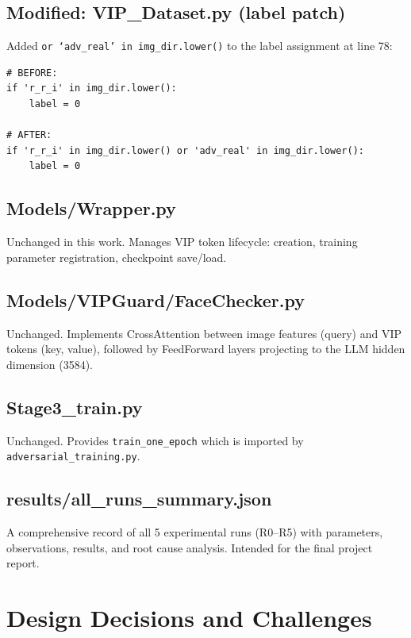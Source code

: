 \documentclass[12pt,a4paper]{article}
\begin{document}
\subsection{Modified: VIP\_Dataset.py (label patch)}

Added \texttt{or `adv\_real' in img\_dir.lower()} to the label assignment at line 78:
\begin{lstlisting}[caption={VIP\_Dataset.py label patch}]
# BEFORE:
if 'r_r_i' in img_dir.lower():
    label = 0

# AFTER:
if 'r_r_i' in img_dir.lower() or 'adv_real' in img_dir.lower():
    label = 0
\end{lstlisting}

\subsection{Models/Wrapper.py}

Unchanged in this work. Manages VIP token lifecycle: creation, training parameter registration, checkpoint save/load.

\subsection{Models/VIPGuard/FaceChecker.py}

Unchanged. Implements CrossAttention between image features (query) and VIP tokens (key, value), followed by FeedForward layers projecting to the LLM hidden dimension (3584).

\subsection{Stage3\_train.py}

Unchanged. Provides \texttt{train\_one\_epoch} which is imported by \texttt{adversarial\_training.py}.

\subsection{results/all\_runs\_summary.json}

A comprehensive record of all 5 experimental runs (R0--R5) with parameters, observations, results, and root cause analysis. Intended for the final project report.

\section{Design Decisions and Challenges}
\end{document}
